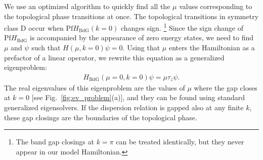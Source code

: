 We use an optimized algorithm to quickly find all the $\mu$ values corresponding to the topological phase transitions at once.
The topological transitions in symmetry class D occur when $\textrm{Pf} H_\textrm{BdG}(k=0)$ changes sign.
\footnote{The band gap closings at $k=\pi$ can be treated identically, but they never appear in our model Hamiltonian.}
Since the sign change of $\textrm{Pf} H_\textrm{BdG}$ is accompanied by the appearance of zero energy states, we need to find $\mu$ and $\psi$ such that $H(\mu, k=0)\psi = 0$.
Using that $\mu$ enters the Hamiltonian as a prefactor of a linear operator, we rewrite this equation as a generalized eigenproblem:
\begin{eqnarray}
H_\textrm{BdG}\left(\mu=0,k=0\right)\psi=\mu\tau_z\psi.\label{eq:eigenproblem}
\end{eqnarray}
The real eigenvalues of this eigenproblem are the values of $\mu$ where the gap closes at $k=0$ [see Fig.~\ref{fig:ev_problem}(a)], and they can be found using standard generalized eigensolvers.
If the dispersion relation is gapped also at any finite $k$, these gap closings are the boundaries of the topological phase.

